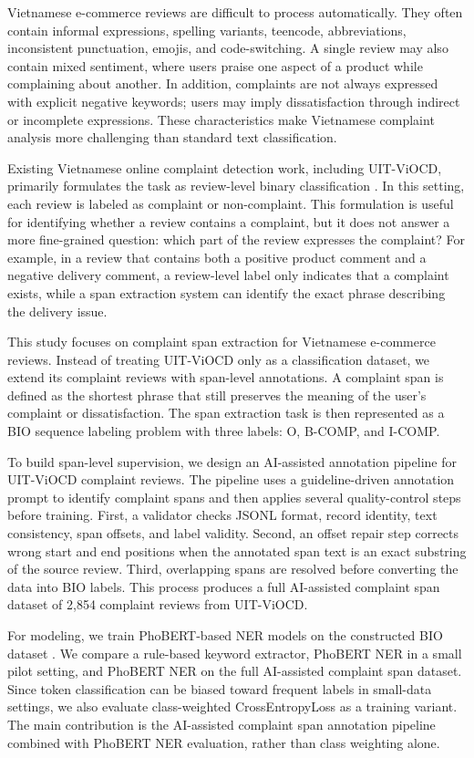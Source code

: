 \documentclass[11pt]{article}
\begin{document}
Vietnamese e-commerce reviews are difficult to process automatically. They often contain informal expressions, spelling variants, teencode, abbreviations, inconsistent punctuation, emojis, and code-switching. A single review may also contain mixed sentiment, where users praise one aspect of a product while complaining about another. In addition, complaints are not always expressed with explicit negative keywords; users may imply dissatisfaction through indirect or incomplete expressions. These characteristics make Vietnamese complaint analysis more challenging than standard text classification.

Existing Vietnamese online complaint detection work, including UIT-ViOCD, primarily formulates the task as review-level binary classification \citep{viocd2021}. In this setting, each review is labeled as complaint or non-complaint. This formulation is useful for identifying whether a review contains a complaint, but it does not answer a more fine-grained question: which part of the review expresses the complaint? For example, in a review that contains both a positive product comment and a negative delivery comment, a review-level label only indicates that a complaint exists, while a span extraction system can identify the exact phrase describing the delivery issue.

This study focuses on complaint span extraction for Vietnamese e-commerce reviews. Instead of treating UIT-ViOCD only as a classification dataset, we extend its complaint reviews with span-level annotations. A complaint span is defined as the shortest phrase that still preserves the meaning of the user's complaint or dissatisfaction. The span extraction task is then represented as a BIO sequence labeling problem with three labels: O, B-COMP, and I-COMP.

To build span-level supervision, we design an AI-assisted annotation pipeline for UIT-ViOCD complaint reviews. The pipeline uses a guideline-driven annotation prompt to identify complaint spans and then applies several quality-control steps before training. First, a validator checks JSONL format, record identity, text consistency, span offsets, and label validity. Second, an offset repair step corrects wrong start and end positions when the annotated span text is an exact substring of the source review. Third, overlapping spans are resolved before converting the data into BIO labels. This process produces a full AI-assisted complaint span dataset of 2,854 complaint reviews from UIT-ViOCD.

For modeling, we train PhoBERT-based NER models on the constructed BIO dataset \citep{phobert2020}. We compare a rule-based keyword extractor, PhoBERT NER in a small pilot setting, and PhoBERT NER on the full AI-assisted complaint span dataset. Since token classification can be biased toward frequent labels in small-data settings, we also evaluate class-weighted CrossEntropyLoss as a training variant. The main contribution is the AI-assisted complaint span annotation pipeline combined with PhoBERT NER evaluation, rather than class weighting alone.
\end{document}
